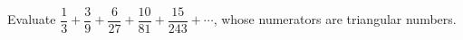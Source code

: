 Evaluate $\dfrac{1}{3}+\dfrac{3}{9}+\dfrac{6}{27}+\dfrac{10}{81}+\dfrac{15}{243}+\cdots $, whose numerators are triangular numbers.
